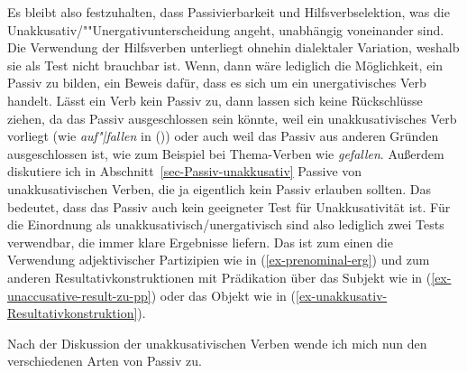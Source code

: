 Es bleibt also festzuhalten, dass Passivierbarkeit und Hilfsverbselektion, was die
Unakkusativ/""Unergativunterscheidung angeht, unabhängig voneinander sind. Die Verwendung der
Hilfsverben unterliegt ohnehin dialektaler Variation, weshalb sie als Test nicht brauchbar
ist. Wenn, dann wäre lediglich die Möglichkeit, ein Passiv zu bilden, ein Beweis dafür, dass es sich
um ein unergativisches Verb handelt. Lässt ein Verb kein Passiv zu, dann lassen sich keine
Rückschlüsse ziehen, da das Passiv ausgeschlossen sein könnte, weil ein unakkusativisches Verb
vorliegt (wie \emph{auf"|fallen} in ()) oder auch weil das Passiv aus anderen Gründen ausgeschlossen ist, wie zum Beispiel bei
Thema-Verben wie \emph{gefallen}. 
\eal
{}
\zl
Außerdem diskutiere ich in Abschnitt~\ref{sec-Passiv-unakkusativ}
Passive von unakkusativischen Verben, die ja eigentlich kein Passiv erlauben sollten. Das bedeutet,
dass das Passiv auch kein geeigneter Test für Unakkusativität ist. Für die Einordnung als
unakkusativisch/unergativisch sind also lediglich zwei Tests verwendbar, die immer klare Ergebnisse
liefern. Das ist zum einen die Verwendung adjektivischer Partizipien wie in (\ref{ex-prenominal-erg}) und zum anderen
Resultativkonstruktionen mit Prädikation über das Subjekt wie in
(\ref{ex-unaccusative-result-zu-pp}) oder das Objekt wie in (\ref{ex-unakkusativ-Resultativkonstruktion}).
\largerpage

Nach der Diskussion der unakkusativischen Verben wende ich mich nun den verschiedenen Arten von Passiv zu.
%
%

